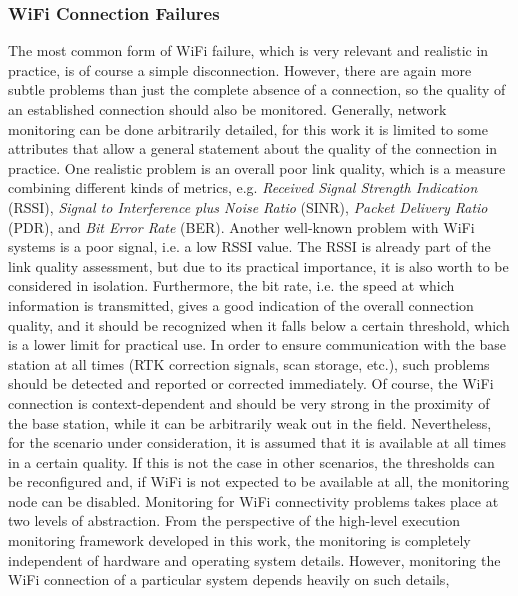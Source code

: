 \documentclass[english, master, utf8]{base/thesis_KBS}
\begin{document}
\subsubsection{WiFi Connection Failures}
\label{sec:sim_and_mon_wifi_connection_problems}

The most common form of WiFi failure, which is very relevant and realistic in practice, is of course a simple disconnection.
However, there are again more subtle problems than just the complete absence of a connection, so the quality of an established connection should also be monitored.
Generally, network monitoring can be done arbitrarily detailed, for this work it is limited to some attributes that allow a general statement about the quality of
the connection in practice. One realistic problem is an overall poor link quality, which is a measure combining different kinds of metrics, e.g.
\textit{Received Signal Strength Indication} (RSSI), \textit{Signal to Interference plus Noise Ratio} (SINR), \textit{Packet Delivery Ratio} (PDR), and
\textit{Bit Error Rate} (BER). \cite{Vlavianos:2008} Another well-known problem with WiFi systems is a poor signal, i.e. a low RSSI value. The RSSI is already part of
the link quality assessment, but due to its practical importance, it is also worth to be considered in isolation. Furthermore, the bit rate, i.e. the speed at which
information is transmitted, gives a good indication of the overall connection quality, and it should be recognized when it falls below a certain threshold, which is a
lower limit for practical use. In order to ensure communication with the base station at all times (RTK correction signals, scan storage, etc.), such problems should be
detected and reported or corrected immediately. Of course, the WiFi connection is context-dependent and should be very strong in the proximity of the base station, while it can
be arbitrarily weak out in the field. Nevertheless, for the scenario under consideration, it is assumed that it is available at all times in a certain quality. If this is not the
case in other scenarios, the thresholds can be reconfigured and, if WiFi is not expected to be available at all, the monitoring node can be disabled.\newline
Monitoring for WiFi connectivity problems takes place at two levels of abstraction. From the perspective of the high-level execution monitoring framework developed in this work,
the monitoring is completely independent of hardware and operating system details. However, monitoring the WiFi connection of a particular system depends heavily on such details,
\end{document}
